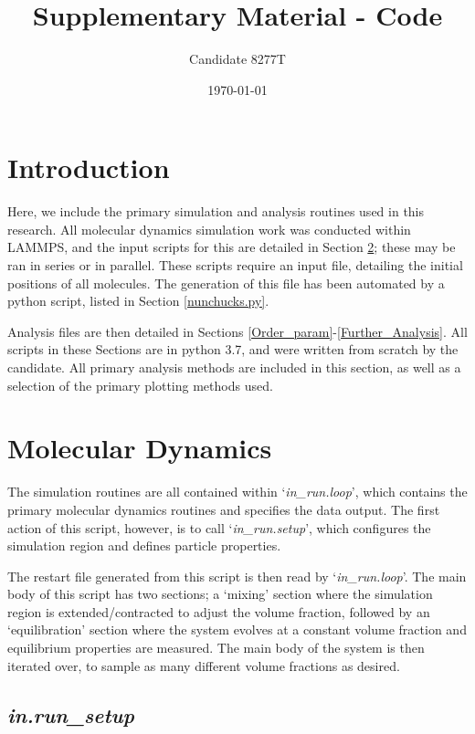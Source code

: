 \documentclass[11pt,a4paper]{article}
\title{Supplementary Material - Code}
\author{Candidate 8277T}
\date{\today}
\begin{document}
	
\maketitle %

\tableofcontents %
\newpage

\section{Introduction}
Here, we include the primary simulation and analysis routines used in this research. All molecular dynamics simulation work was conducted within LAMMPS, and the input scripts for this are detailed in Section \ref{LAMMPS}; these may be ran in series or in parallel. These scripts require an input file, detailing the initial positions of all molecules. The generation of this file has been automated by a python script, listed in Section \ref{nunchucks.py}. 

Analysis files are then detailed in Sections \ref{Order_param}-\ref{Further_Analysis}. All scripts in these Sections are in python 3.7, and were written from scratch by the candidate. All primary analysis methods are included in this section, as well as a selection of the primary plotting methods used.

\section{Molecular Dynamics} \label{LAMMPS}
The simulation routines are all contained within `\textit{in\_run.loop}', which contains the primary molecular dynamics routines and specifies the data output. The first action of this script, however, is to call `\textit{in\_run.setup}', which configures the simulation region and defines particle properties. 

The restart file generated from this script is then read by `\textit{in\_run.loop}'. The main body of this script has two sections; a `mixing' section where the simulation region is extended/contracted to adjust the volume fraction, followed by an `equilibration' section where the system evolves at a constant volume fraction and equilibrium properties are measured. The main body of the system is then iterated over, to sample as many different volume fractions as desired.

\subsection{\textit{in.run\_setup}}
 \mbox{}\\ 
\end{document}
